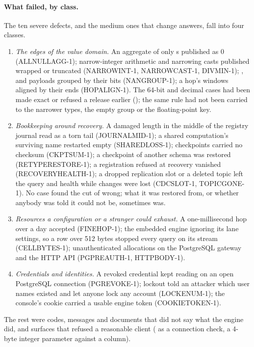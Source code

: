 \documentclass[11pt,a4paper]{article}
\renewcommand{\_}{\oldunderscore\allowbreak}
\newcommand{\code}[1]{\texttt{\pvbreakable{#1}}}
\begin{document}
\paragraph{What failed, by class.} The ten severe defects, and the medium ones that change answers, fall
into four classes.
\begin{enumerate}[leftmargin=*,itemsep=2pt]
\item \emph{The edges of the value domain.} An aggregate of only \code{NULL}s published as $0$
      (ALLNULLAGG-1); narrow-integer arithmetic and narrowing casts published wrapped or truncated
      (NARROWINT-1, NARROWCAST-1, DIVMIN-1); \code{-0.0}, \code{0.0} and \code{NaN} payloads grouped by
      their bits (NANGROUP-1); a hop's windows aligned by their ends (HOPALIGN-1). The 64-bit and decimal
      cases had been made exact or refused a release earlier (); the same rule had not
      been carried to the narrower types, the empty group or the floating-point key.
\item \emph{Bookkeeping around recovery.} A damaged length in the middle of the registry journal read as a
      torn tail (JOURNALMID-1); a shared computation's surviving name restarted empty (SHAREDLOSS-1);
      checkpoints carried no checksum (CKPTSUM-1); a checkpoint of another schema was restored
      (RETYPERESTORE-1); a registration refused at recovery vanished (RECOVERYHEALTH-1); a dropped
      replication slot or a deleted topic left the query \code{RUNNING} and health \code{UP} while changes
      were lost (CDCSLOT-1, TOPICGONE-1). No case found the cut of  wrong; what it was
      restored from, or whether anybody was told it could not be, sometimes was.
\item \emph{Resources a configuration or a stranger could exhaust.} A one-millisecond hop over a day
      accepted (FINEHOP-1); the embedded engine ignoring its lane settings, so a row over 512 bytes stopped
      every query on its stream (CELLBYTES-1); unauthenticated allocations on the PostgreSQL gateway and the
      HTTP API (PGPREAUTH-1, HTTPBODY-1).
\item \emph{Credentials and identities.} A revoked credential kept reading on an open PostgreSQL connection
      (PGREVOKE-1); lockout told an attacker which user names existed and let anyone lock any account
      (LOCKENUM-1); the console's cookie carried a usable engine token (COOKIETOKEN-1).
\end{enumerate}
The rest were codes, messages and documents that did not say what the engine did, and surfaces that
refused a reasonable client (\code{SELECT 1} as a connection check, a 4-byte integer parameter against a
\code{BIGINT} column).
\end{document}
